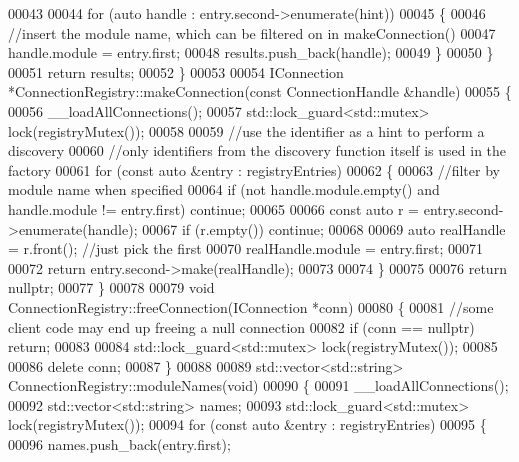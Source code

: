 \begin{DoxyCode}
00043 
00044         \textcolor{keywordflow}{for} (\textcolor{keyword}{auto} handle : entry.second->enumerate(hint))
00045         \{
00046             \textcolor{comment}{//insert the module name, which can be filtered on in makeConnection()}
00047             handle.module = entry.first;
00048             results.push\_back(handle);
00049         \}
00050     \}
00051     \textcolor{keywordflow}{return} results;
00052 \}
00053 
00054 IConnection *ConnectionRegistry::makeConnection(\textcolor{keyword}{const} ConnectionHandle &handle)
00055 \{
00056     __loadAllConnections();
00057     std::lock\_guard<std::mutex> lock(registryMutex());
00058 
00059     \textcolor{comment}{//use the identifier as a hint to perform a discovery}
00060     \textcolor{comment}{//only identifiers from the discovery function itself is used in the factory}
00061     \textcolor{keywordflow}{for} (\textcolor{keyword}{const} \textcolor{keyword}{auto} &entry : registryEntries)
00062     \{
00063         \textcolor{comment}{//filter by module name when specified}
00064         \textcolor{keywordflow}{if} (not handle.module.empty() and handle.module != entry.first) \textcolor{keywordflow}{continue};
00065 
00066         \textcolor{keyword}{const} \textcolor{keyword}{auto} r = entry.second->enumerate(handle);
00067         \textcolor{keywordflow}{if} (r.empty()) \textcolor{keywordflow}{continue};
00068 
00069         \textcolor{keyword}{auto} realHandle = r.front(); \textcolor{comment}{//just pick the first}
00070         realHandle.module = entry.first;
00071 
00072         \textcolor{keywordflow}{return} entry.second->make(realHandle);
00073 
00074     \}
00075 
00076     \textcolor{keywordflow}{return} \textcolor{keyword}{nullptr};
00077 \}
00078 
00079 \textcolor{keywordtype}{void} ConnectionRegistry::freeConnection(IConnection *conn)
00080 \{
00081     \textcolor{comment}{//some client code may end up freeing a null connection}
00082     \textcolor{keywordflow}{if} (conn == \textcolor{keyword}{nullptr}) \textcolor{keywordflow}{return};
00083 
00084     std::lock\_guard<std::mutex> lock(registryMutex());
00085 
00086     \textcolor{keyword}{delete} conn;
00087 \}
00088 
00089 std::vector<std::string> ConnectionRegistry::moduleNames(\textcolor{keywordtype}{void})
00090 \{
00091     __loadAllConnections();
00092     std::vector<std::string> names;
00093     std::lock\_guard<std::mutex> lock(registryMutex());
00094     \textcolor{keywordflow}{for} (\textcolor{keyword}{const} \textcolor{keyword}{auto} &entry : registryEntries)
00095     \{
00096         names.push\_back(entry.first);

\end{DoxyCode}
